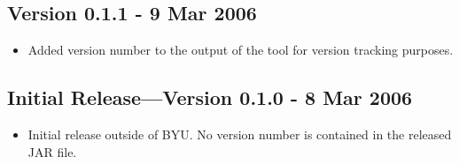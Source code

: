 \documentclass[english]{article}
\numberwithin{figure}{section}
\begin{document}
\subsection*{Version 0.1.1 - 9 Mar 2006}
\begin{itemize}
\item Added version number to the output of the tool for version tracking
purposes.
\end{itemize}

\subsection*{Initial Release---Version 0.1.0 - 8 Mar 2006}
\begin{itemize}
\item Initial release outside of BYU\@. No version number is contained in
the released JAR file.
\end{itemize}
\end{document}
